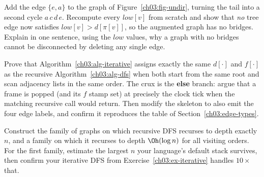 \begin{exercise}\label{ch03:ex-bridges}
Add the edge $\{e,a\}$ to the graph of Figure~\ref{ch03:fig-undir}, turning the tail into a second cycle $a\,c\,d\,e$. Recompute every $\mathit{low}[v]$ from scratch and show that \emph{no} tree edge now satisfies $\mathit{low}[v]>d[\pi[v]]$, so the augmented graph has no bridges. Explain in one sentence, using the $\mathit{low}$ values, why a graph with no bridges cannot be disconnected by deleting any single edge.
\end{exercise}

\begin{exercise}\label{ch03:ex-cursor}
Prove that Algorithm~\ref{ch03:alg-iterative} assigns exactly the same $d[\cdot]$ and $f[\cdot]$ as the recursive Algorithm~\ref{ch03:alg-dfs} when both start from the same root and scan adjacency lists in the same order. The crux is the \textbf{else} branch: argue that a frame is popped (and its $f$ stamp set) at precisely the clock tick when the matching recursive call would return. Then modify the skeleton to also emit the four edge labels, and confirm it reproduces the table of Section~\ref{ch03:edge-types}.
\end{exercise}

\begin{exercise}\label{ch03:ex-deep}
Construct the family of graphs on which recursive DFS recurses to depth exactly $n$, and a family on which it recurses to depth $\Oh(\log n)$ for all visiting orders. For the first family, estimate the largest $n$ your language's default stack survives, then confirm your iterative DFS from Exercise~\ref{ch03:ex-iterative} handles $10\times$ that.
\end{exercise}
